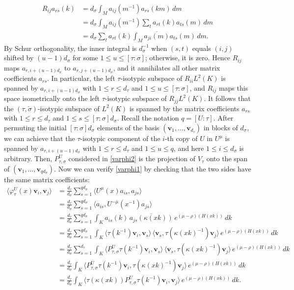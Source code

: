 \documentclass[11pt,oneside]{amsart}
\numberwithin{equation}{section}
\theoremstyle{remark}
\theoremstyle{plain}
\newcommand{\bv}{\mathbf{v}}
\newcommand\ov{\overline}
\renewcommand\leq{\leqslant}
\begin{document}
\begin{align*}
R_{ij}a_{rs}(k)&=d_\sigma\int_M a_{ij}(m^{-1})a_{rs}(km)\,dm\\
&=d_\sigma\int_M a_{ij}(m^{-1})\sum_t a_{rt}(k)a_{ts}(m)\,dm\\
&=d_\sigma\sum_t a_{rt}(k)\int_M\ov{a_{ji}(m)}a_{ts}(m)\,dm.
\end{align*}
By Schur orthogonality, the inner integral is $d_\sigma^{-1}$ when $(s,t)$ equals $(i,j)$ shifted by $(u-1)d_\sigma$ for some $1\leq u\leq [\tau:\sigma]$; otherwise, it is zero. Hence $R_{ij}$ maps $a_{r,i+(u-1)d_\sigma}$ to $a_{r,j+(u-1)d_\sigma}$, and it annihilates all other matrix coefficients $a_{rs}$. In particular, the left $\tau$-isotypic subspace of $R_{ii}L^2(K)$ is spanned by $a_{r,i+(u-1)d_\sigma}$ with $1\leq r\leq d_\tau$ and $1\leq u\leq [\tau:\sigma]$, and $R_{ij}$ maps this space isometrically onto the left $\tau$-isotypic subspace of $R_{jj}L^2(K)$. It follows that the $(\tau,\check\sigma)$-isotypic subspace of $L^2(K)$ is spanned by the matrix coefficients $a_{rs}$ with $1\leq r\leq d_\tau$ and $1\leq s\leq [\tau:\sigma]d_\sigma$. Recall the notation $q=[U:\tau]$. After permuting the initial $[\tau:\sigma]d_\sigma$ elements of the basis $(\bv_1,\dotsc,\bv_{d_\tau})$ in blocks of $d_\sigma$, we can achieve that the $\tau$-isotypic component of the $i$-th copy of $U$ in $U^\mu$ is spanned by $a_{r,i+(u-1)d_\sigma}$ with $1\leq r\leq d_\tau$ and $1\leq u\leq q$, and here $1\leq i\leq d_\sigma$ is arbitrary. Then, $P_{\tau,\sigma}^U$ considered in \eqref{varphi2} is the projection of $V_\tau$ onto the span of $(\bv_1,\dotsc,\bv_{qd_\sigma})$. Now we can verify \eqref{varphi1} by checking that the two sides have the same matrix coefficients:
\begin{align*}
\langle\varphi_\tau^U(x)\bv_i,\bv_j\rangle
&=\frac{d_\tau}{d_\sigma}\sum_{s=1}^{qd_\sigma}\langle U^{\mu}(x)a_{is},a_{js}\rangle\\
&=\frac{d_\tau}{d_\sigma}\sum_{s=1}^{qd_\sigma}\langle a_{is},U^{-\ov{\mu}}(x^{-1})a_{js}\rangle\\
&=\frac{d_\tau}{d_\sigma}\sum_{s=1}^{qd_\sigma}\int_K a_{is}(k)\,\ov{a_{js}(\kappa(xk))}\,e^{(\mu-\rho)(H(xk))}\,dk\\
&=\frac{d_\tau}{d_\sigma}\sum_{s=1}^{qd_\sigma}\int_K 
\langle\tau(k^{-1})\bv_i,\bv_s\rangle\,\langle\bv_s,\tau(\kappa(xk)^{-1})\bv_j\rangle\,e^{(\mu-\rho)(H(xk))}\,dk\\
&=\frac{d_\tau}{d_\sigma}\sum_{s=1}^{d_\tau}\int_K 
\langle P_{\tau,\sigma}^U\tau(k^{-1})\bv_i,\bv_s\rangle\,\langle\bv_s,\tau(\kappa(xk)^{-1})\bv_j\rangle\,e^{(\mu-\rho)(H(xk))}\,dk\\
&=\frac{d_\tau}{d_\sigma}\int_K 
\langle P_{\tau,\sigma}^U\tau(k^{-1})\bv_i,\tau(\kappa(xk)^{-1})\bv_j\rangle\,e^{(\mu-\rho)(H(xk))}\,dk\\
&=\frac{d_\tau}{d_\sigma}\int_K 
\langle \tau(\kappa(xk))P_{\tau,\sigma}^U\tau(k^{-1})\bv_i,\bv_j\rangle\,e^{(\mu-\rho)(H(xk))}\,dk.
\end{align*}
\end{document}
